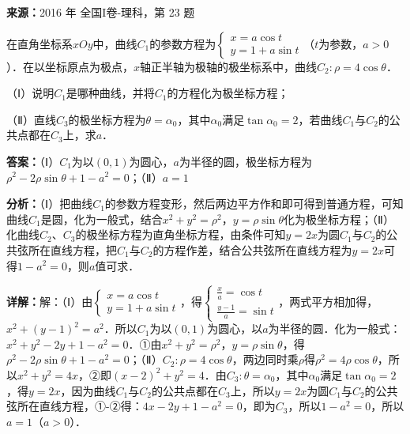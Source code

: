 \begin{question}[points=10]
\textbf{来源：}2016 年 全国I卷-理科，第 23 题\par
在直角坐标系$xOy$中，曲线$C_1$的参数方程为$\begin{cases}x=a\cos t\\ y=1+a\sin t\end{cases}$（$t$为参数，$a>0$）．在以坐标原点为极点，$x$轴正半轴为极轴的极坐标系中，曲线$C_2:\rho=4\cos\theta$．

（Ⅰ）说明$C_1$是哪种曲线，并将$C_1$的方程化为极坐标方程；

（Ⅱ）直线$C_3$的极坐标方程为$\theta=\alpha_0$，其中$\alpha_0$满足$\tan\alpha_0=2$，若曲线$C_1$与$C_2$的公共点都在$C_3$上，求$a$．
\begin{solution}
\textbf{答案：}（Ⅰ）$C_1$为以$(0,1)$为圆心，$a$为半径的圆，极坐标方程为$\rho^2-2\rho\sin\theta+1-a^2=0$；（Ⅱ）$a=1$

\textbf{分析：}（Ⅰ）把曲线$C_1$的参数方程变形，然后两边平方作和即可得到普通方程，可知曲线$C_1$是圆，化为一般式，结合$x^2+y^2=\rho^2$，$y=\rho\sin\theta$化为极坐标方程；（Ⅱ）化曲线$C_2$、$C_3$的极坐标方程为直角坐标方程，由条件可知$y=2x$为圆$C_1$与$C_2$的公共弦所在直线方程，把$C_1$与$C_2$的方程作差，结合公共弦所在直线方程为$y=2x$可得$1-a^2=0$，则$a$值可求．

\textbf{详解：}解：（Ⅰ）由$\begin{cases}x=a\cos t\\ y=1+a\sin t\end{cases}$，得$\begin{cases}\frac{x}{a}=\cos t\\ \frac{y-1}{a}=\sin t\end{cases}$，两式平方相加得，$x^2+(y-1)^2=a^2$．所以$C_1$为以$(0,1)$为圆心，以$a$为半径的圆．化为一般式：$x^2+y^2-2y+1-a^2=0$．①由$x^2+y^2=\rho^2$，$y=\rho\sin\theta$，得$\rho^2-2\rho\sin\theta+1-a^2=0$；（Ⅱ）$C_2:\rho=4\cos\theta$，两边同时乘$\rho$得$\rho^2=4\rho\cos\theta$，所以$x^2+y^2=4x$，②即$(x-2)^2+y^2=4$．由$C_3:\theta=\alpha_0$，其中$\alpha_0$满足$\tan\alpha_0=2$，得$y=2x$，因为曲线$C_1$与$C_2$的公共点都在$C_3$上，所以$y=2x$为圆$C_1$与$C_2$的公共弦所在直线方程，①-②得：$4x-2y+1-a^2=0$，即为$C_3$，所以$1-a^2=0$，所以$a=1$（$a>0$）．
\end{solution}
\end{question}

